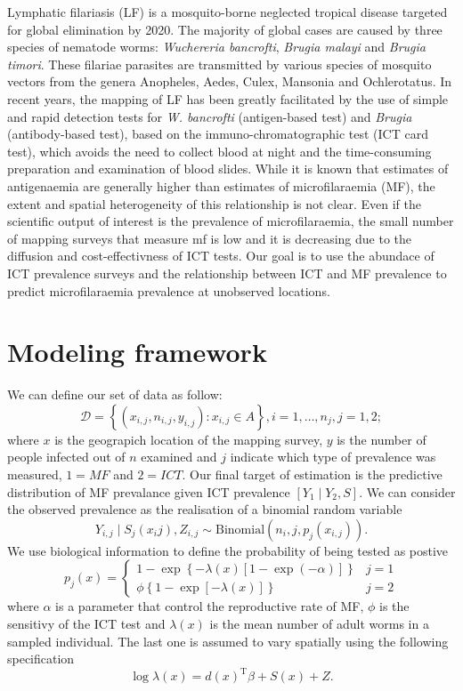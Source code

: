\documentclass[11pt,]{article}
\begin{document}
Lymphatic filariasis (LF) is a mosquito-borne neglected tropical disease
targeted for global elimination by 2020. The majority of global cases
are caused by three species of nematode worms: \emph{Wuchereria
bancrofti}, \emph{Brugia malayi} and \emph{Brugia timori}. These
filariae parasites are transmitted by various species of mosquito
vectors from the genera Anopheles, Aedes, Culex, Mansonia and
Ochlerotatus. In recent years, the mapping of LF has been greatly
facilitated by the use of simple and rapid detection tests for \emph{W.
bancrofti} (antigen-based test) and \emph{Brugia} (antibody-based test),
based on the immuno-chromatographic test (ICT card test), which avoids
the need to collect blood at night and the time-consuming preparation
and examination of blood slides. While it is known that estimates of
antigenaemia are generally higher than estimates of microfilaraemia
(MF), the extent and spatial heterogeneity of this relationship is not
clear. Even if the scientific output of interest is the prevalence of
microfilaraemia, the small number of mapping surveys that measure mf is
low and it is decreasing due to the diffusion and cost-effectivness of
ICT tests. Our goal is to use the abundace of ICT prevalence surveys and
the relationship between ICT and MF prevalence to predict
microfilaraemia prevalence at unobserved locations.

\section{Modeling framework}\label{modeling-framework}

We can define our set of data as follow:
\[\mathcal{D}=\left\{ \left(x_{i,j},n_{i,j},y_{i,j}\right):x_{i,j}\in A\right\} ,i=1,\ldots,n_{j},j=1,2; \label{eq:data}\]
where \(x\) is the geograpich location of the mapping survey, \(y\) is
the number of people infected out of \(n\) examined and \(j\) indicate
which type of prevalence was measured, \(1 = MF\) and \(2 = ICT\). Our
final target of estimation is the predictive distribution of MF
prevalance given ICT prevalence \(\left[Y_1 \mid Y_2, S\right]\). We can
consider the observed prevalence as the realisation of a binomial random
variable
\[Y_{i,j} \mid S_j(x_ij),Z_{i,j} \sim \text{Binomial}(n_i,j,p_j(x_{i,j})).\]
We use biological information to define the probability of being tested
as postive \[
p_{j}\left(x\right)=\begin{cases}
1-\exp\left\{ -\lambda\left(x\right)\left[1-\exp\left(-\alpha\right)\right]\right\} & j=1 \\
\phi\left\{ 1-\exp\left[-\lambda\left(x\right)\right]\right\} & j=2
\end{cases}
\] where \(\alpha\) is a parameter that control the reproductive rate of
MF, \(\phi\) is the sensitivy of the ICT test and \(\lambda(x)\) is the
mean number of adult worms in a sampled individual. The last one is
assumed to vary spatially using the following specification
\[\log{\lambda(x)}=d(x)^\text{T}\beta+S(x)+Z.\]
\end{document}

